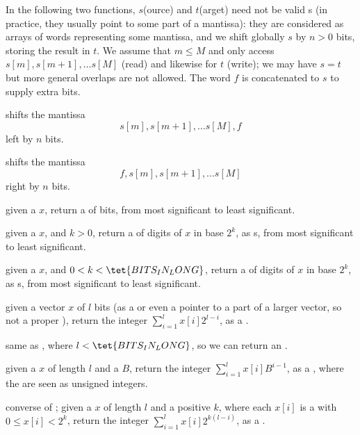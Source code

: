 In the following two functions, $s$(ource) and $t$(arget)
need not be valid s (in practice, they usually point to some part of a
 mantissa): they are considered as arrays of words representing some
mantissa, and we shift globally $s$ by $n > 0$ bits, storing the result in
$t$. We assume that $m\leq M$ and only access $s[m], s[m+1],\ldots s[M]$
(read) and likewise for $t$ (write); we may have $s = t$ but more general
overlaps are not allowed. The word $f$ is concatenated to $s$ to supply extra
bits.

shifts the mantissa
$$s[m], s[m+1],\ldots s[M], f$$
left by $n$ bits.

shifts the mantissa
$$f, s[m], s[m+1],\ldots s[M]$$
right by $n$ bits.


 given a  $x$, return a  of
bits, from most significant to least significant.

 given a  $x$, and
$k > 0$, return a  of digits of $x$ in base $2^k$, as s, from
most significant to least significant.

 given a  $x$, and $0 < k <
\tet{BITS_IN_LONG}$, return a  of digits of $x$ in base $2^k$, as
s, from most significant to least significant.

 given a vector $x$ of $l$ bits (as a
 or even a pointer to a part of a larger vector, so not a
proper ), return the integer $\sum_{i = 1}^l x[i] 2^{l-i}$, as a
.

 same as , where
$l < \tet{BITS_IN_LONG}$, so we can return an .

given a  $x$ of length $l$ and a  $B$,
return the integer $\sum_{i = 1}^l x[i] B^{i-1}$, as a ,
where the  are seen as unsigned integers.

 converse of ;
given a  $x$ of length $l$ and a positive  $k$,
where each $x[i]$ is a  with $0\leq x[i] < 2^k$, return the
integer $\sum_{i = 1}^l x[i] 2^{k(l-i)}$, as a .

